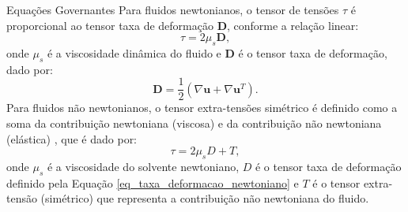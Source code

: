 \begin{frame}{Equações Governantes}
Para fluidos newtonianos, o tensor de tensões $\tau$ é proporcional ao tensor taxa de deformação $\mathbf{D}$, conforme a relação linear:
\begin{equation}\label{eq_tensoes_totais_newtoniano}
    \tau = 2 \mu_s \mathbf{D},
\end{equation}
onde $\mu_s$ é a viscosidade dinâmica do fluido e $\mathbf{D}$ é o tensor taxa de deformação, dado por:
\begin{equation}\label{eq_taxa_deformacao_newtoniano}
    \mathbf{D} = \frac{1}{2}(\nabla \mathbf{u} + \nabla\mathbf{u}^{T} ).
\end{equation}
Para fluidos não newtonianos, o tensor extra-tensões simétrico é definido como a soma da contribuição newtoniana (viscosa) e da contribuição não newtoniana (elástica) \cite{RAJAGOPALAN1990}, que é dado por:
\begin{equation}\label{eq_tensoes_totais_nao_newtoniano}
    \tau=2 \mu_s D+T,
\end{equation}
onde $\mu_s$ é a viscosidade do solvente newtoniano, $D$ é o tensor taxa de deformação definido pela Equação \eqref{eq_taxa_deformacao_newtoniano} e $T$ é o tensor extra-tensão (simétrico) que representa a contribuição não newtoniana do fluido.
\end{frame}

